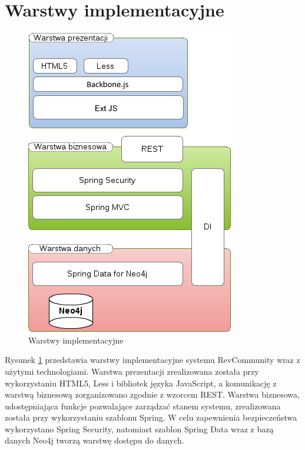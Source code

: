 \section{Warstwy implementacyjne}
\begin{figure}[H]
	\centering
	\includegraphics[scale=0.9]{images/warstwy.png}
	\caption{Warstwy implementacyjne}
	\label{fig:warstwy}
\end{figure}

Rysunek \ref{fig:warstwy} przedstawia warstwy implementacyjne systemu RevCommunity wraz z użytymi technologiami. Warstwa prezentacji zrealizowana została przy wykorzystaniu HTML5, Less i bibliotek języka JavaScript, a komunikację z warstwą biznesową zorganizowano zgodnie z wzorcem REST. Warstwa biznesowa, udostępniająca funkcje pozwalające zarządzać stanem systemu, zrealizowana została przy wykorzystaniu szablonu Spring. W celu zapewnienia bezpieczeństwa wykorzystano Spring Security, natomiast szablon Spring Data wraz z bazą danych Neo4j tworzą warstwę dostępu do danych.

\newpage